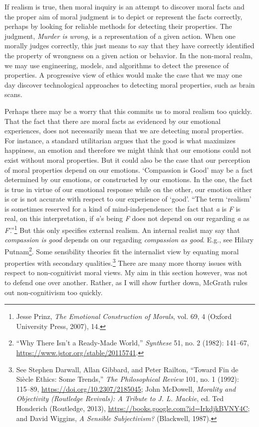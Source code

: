 \documentclass[phdthesis,12pt,final,a4paper]{wuthesis}
\theoremstyle{definition}
\theoremstyle{definition}
\theoremstyle{definition}
\theoremstyle{definition}
\theoremstyle{remark}
\begin{document}
If realism is true, then moral inquiry is an attempt to discover moral facts and the proper aim of moral judgment is to depict or represent the facts correctly, perhaps by looking for reliable methods for detecting their properties. The judgment, \emph{Murder is wrong}, is a representation of a given action. When one morally judges correctly, this just means to say that they have correctly identified the property of wrongness on a given action or behavior. In the non-moral realm, we may use engineering, models, and algorithms to detect the presence of properties. A progressive view of ethics would make the case that we may one day discover technological approaches to detecting moral properties, such as brain scans.

Perhaps there may be a worry that this commits us to moral realism too quickly. That the fact that there are moral facts as evidenced by our emotional experiences, does not necessarily mean that we are detecting moral properties. For instance, a standard utilitarian argues that the good is what maximizes happiness, an emotion and therefore we might think that our emotions could not exist without moral properties. But it could also be the case that our perception of moral properties depend on our emotions. `Compassion is Good' may be a fact determined by our emotions, or constructed by our emotions. In the one, the fact is true in virtue of our emotional response while on the other, our emotion either is or is not accurate with respect to our experience of `good'. ``The term `realism' is sometimes reserved for a kind of mind-independence: the fact that \emph{a} is \emph{F} is real, on this interpretation, if \emph{a}'s being \emph{F} does not depend on our regarding \emph{a} as \emph{F}'.''\footnote{Jesse Prinz, \emph{The {Emotional Construction} of {Morals}}, vol. 69, 4 (Oxford University Press, 2007), 14.} But this only specifies external realism. An internal realist may say that \emph{compassion is good} depends on our regarding \emph{compassion as good}. E.g., see Hilary Putnam\footnote{{``Why {There Isn}'t a {Ready-Made World},''} \emph{Synthese} 51, no. 2 (1982): 141--67, \url{https://www.jstor.org/stable/20115741}.}. Some sensibility theories fit the internalist view by equating moral properties with secondary qualities.\footnote{See Stephen Darwall, Allan Gibbard, and Peter Railton, {``Toward Fin de Siècle Ethics: Some Trends,''} \emph{The Philosophical Review} 101, no. 1 (1992): 115--89, \url{https://doi.org/10.2307/2185045}; John McDowell, \emph{Morality and {Objectivity} ({Routledge Revivals}): {A Tribute} to {J}. {L}. {Mackie}}, ed. Ted Honderich (Routledge, 2013), \url{https://books.google.com?id=IrkdjkBVNY4C}; and David Wiggins, \emph{A {Sensible Subjectivism}?} (Blackwell, 1987).} There are many more thorny issues with respect to non-cognitivist moral views. My aim in this section however, was not to defend one over another. Rather, as I will show further down, McGrath rules out non-cognitivism too quickly.
\end{document}
